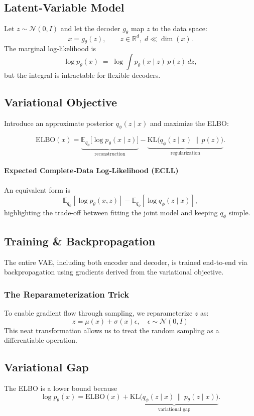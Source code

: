 \documentclass{article}
\begin{document}

\subsection{Latent‑Variable Model}
Let \(z\sim\mathcal{N}(0,I)\) and let the decoder \(g_\theta\) map \(z\) to the data space:
\[
x = g_\theta(z),\qquad z\in\mathbb{R}^d,\; d\ll\dim(x).
\]
The marginal log‑likelihood is
\[
\log p_\theta(x) \;=\; \log\!\int p_\theta(x\mid z)\,p(z)\,dz,
\]
but the integral is intractable for flexible decoders.

\subsection{Variational Objective}
Introduce an approximate posterior \(q_\phi(z\mid x)\) and maximize the ELBO:

\[
\text{ELBO}(x)=
  \underbrace{\mathbb{E}_{q_\phi}\!\bigl[\log p_\theta(x\mid z)\bigr]}_{\text{reconstruction}}
  -\underbrace{\mathrm{KL}\bigl(q_\phi(z\mid x)\,\|\,p(z)\bigr)}_{\text{regularization}}.
\]

\paragraph{Expected Complete‑Data Log‑Likelihood (ECLL)}
An equivalent form is
\[
\mathbb{E}_{q_\phi}[\log p_\theta(x,z)]-\mathbb{E}_{q_\phi}[\log q_\phi(z\mid x)],
\]
highlighting the trade‑off between fitting the joint model and keeping \(q_\phi\) simple.


\subsection{Training \& Backpropagation}
The entire VAE, including both encoder and decoder, is trained end-to-end via backpropagation using gradients derived from the variational objective.

\subsubsection{The Reparameterization Trick}
To enable gradient flow through sampling, we reparameterize \(z\) as:
\[
z = \mu(x) + \sigma(x)\epsilon, \quad \epsilon \sim \mathcal{N}(0, I)
\]
This neat transformation allows us to treat the random sampling as a differentiable operation.

\subsection{Variational Gap}
The ELBO is a lower bound because
\[
\log p_\theta(x)
  = \text{ELBO}(x)
  + \underbrace{\mathrm{KL}\!\bigl(q_\phi(z\mid x)\,\|\,p_\theta(z\mid x)\bigr)}_{\text{variational gap}}\!.
\]
\end{document}
